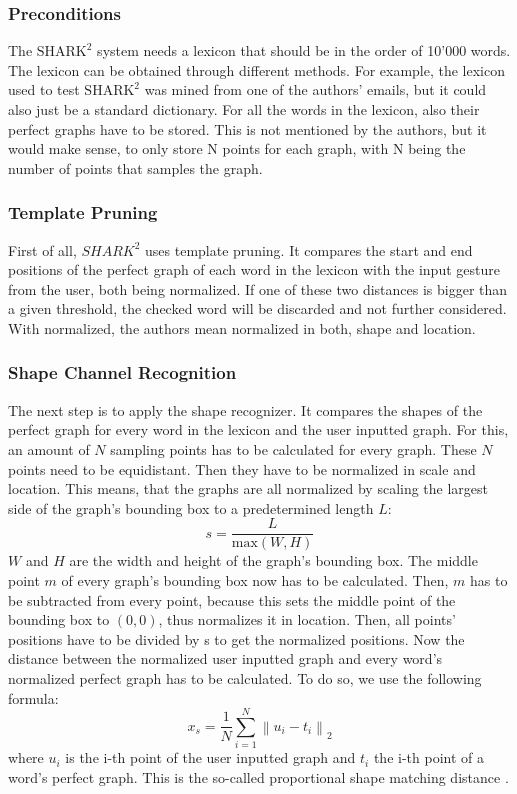 \subsubsection{Preconditions}
The $\text{SHARK}^2$ system needs a lexicon that should be in the order of 10'000 words. The lexicon can be obtained through different methods. For example, the lexicon used to test $\text{SHARK}^2$ was mined from one of the authors' emails, but it could also just be a standard dictionary. For all the words in the lexicon, also their perfect graphs have to be stored. This is not mentioned by the authors, but it would make sense, to only store N points for each graph, with N being the number of points that samples the graph.\\

\subsubsection{Template Pruning}
First of all, $SHARK^2$ uses template pruning. It compares the start and end positions of the perfect graph of each word in the lexicon with the input gesture from the user, both being normalized. If one of these two distances is bigger than a given threshold, the checked word will be discarded and not further considered. With normalized, the authors mean normalized in both, shape and location.\\

\subsubsection{Shape Channel Recognition}
\label{normalize}
The next step is to apply the shape recognizer. It compares the shapes of the perfect graph for every word in the lexicon and the user inputted graph. For this, an amount of $N$ sampling points has to be calculated for every graph. These $N$ points need to be equidistant. Then they have to be normalized in scale and location. This means, that the graphs are all normalized by scaling the largest side of the graph's bounding box to a predetermined length $L$: 
\begin{equation}
    s = \frac{L}{\text{max}(W,H)}
\end{equation}
$W$ and $H$ are the width and height of the graph's bounding box. The middle point $m$ of every graph's bounding box now has to be calculated. Then, $m$ has to be subtracted from every point, because this sets the middle point of the bounding box to $(0,0)$, thus normalizes it in location. Then, all points' positions have to be divided by s to get the normalized positions. Now the distance between the normalized user inputted graph and every word's normalized perfect graph has to be calculated. To do so, we use the following formula:
\begin{equation}
    x_s = \frac{1}{N}\sum_{i = 1}^{N}\left\lVert u_i - t_i\right\rVert_2
\end{equation}
where $u_i$ is the i-th point of the user inputted graph and $t_i$ the i-th point of a word's perfect graph. This is the so-called proportional shape matching distance \cite{Kristensson2004SHARK2AL}.

